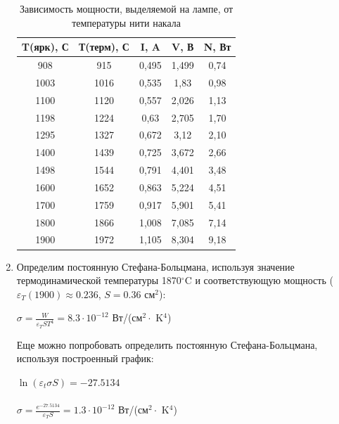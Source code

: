 \documentclass[a4paper, 12pt]{article}
\begin{document}
\begin{enumerate}
\begin{table}[h]
    \centering
    \begin{center}
    \caption{Зависимость мощности, выделяемой на лампе, от температуры нити накала}
    \end{center}
    \vspace{0.1cm}
    \label{tab:my_label}
\begin{tabular}{|c|c|c|c|c|}
\hline
T(ярк), С & Т(терм), С & I, A  & V, В  & N, Вт \\ \hline
908       & 915        & 0,495 & 1,499 & 0,74  \\ \hline
1003      & 1016       & 0,535 & 1,83  & 0,98  \\ \hline
1100      & 1120       & 0,557 & 2,026 & 1,13  \\ \hline
1198      & 1224       & 0,63  & 2,705 & 1,70  \\ \hline
1295      & 1327       & 0,672 & 3,12  & 2,10  \\ \hline
1400      & 1439       & 0,725 & 3,672 & 2,66  \\ \hline
1498      & 1544       & 0,791 & 4,401 & 3,48  \\ \hline
1600      & 1652       & 0,863 & 5,224 & 4,51  \\ \hline
1700      & 1759       & 0,917 & 5,901 & 5,41  \\ \hline
1800      & 1866       & 1,008 & 7,085 & 7,14  \\ \hline
1900      & 1972       & 1,105 & 8,304 & 9,18  \\ \hline
\end{tabular}
\end{table}   

\item Определим постоянную Стефана-Больцмана, используя значение термодинамической температуры 1870$^{\circ}$C и соответствующую мощность ($\varepsilon_T(1900) \approx 0.236$, $S = 0.36$ см$^2$):
\begin{center}
    $\sigma = \frac{W}{\varepsilon_T S T^4} = 8.3 \cdot 10^{-12}$ Вт/(см$^2 \cdot$ K$^4$)
\end{center}
Еще  можно попробовать определить постоянную Стефана-Больцмана, используя построенный график:
\begin{center}
    $\ln(\varepsilon_t \sigma S) = -27.5134$ \\
    \\
    $\sigma = \frac{e^{-27.5134}}{\varepsilon_T S} = 1.3 \cdot 10^{-12}$ Вт/(см$^2 \cdot$ K$^4$)
\end{center}


\end{enumerate}
\end{document}
